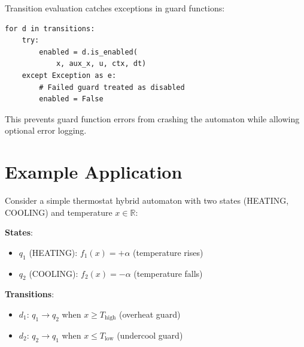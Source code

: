 \documentclass[conference]{IEEEtran}
\begin{document}
Transition evaluation catches exceptions in guard functions:
\begin{lstlisting}[caption={Guard Exception Handling}]
for d in transitions:
    try:
        enabled = d.is_enabled(
            x, aux_x, u, ctx, dt)
    except Exception as e:
        # Failed guard treated as disabled
        enabled = False
\end{lstlisting}

This prevents guard function errors from crashing the automaton while allowing optional error logging.

\section{Example Application}

Consider a simple thermostat hybrid automaton with two states (HEATING, COOLING) and temperature $x \in \mathbb{R}$:

\textbf{States}:
\begin{itemize}
\item $q_1$ (HEATING): $f_1(x) = +\alpha$ (temperature rises)
\item $q_2$ (COOLING): $f_2(x) = -\alpha$ (temperature falls)
\end{itemize}

\textbf{Transitions}:
\begin{itemize}
\item $d_1$: $q_1 \rightarrow q_2$ when $x \geq T_{\text{high}}$ (overheat guard)
\item $d_2$: $q_2 \rightarrow q_1$ when $x \leq T_{\text{low}}$ (undercool guard)
\end{itemize}
\end{document}
